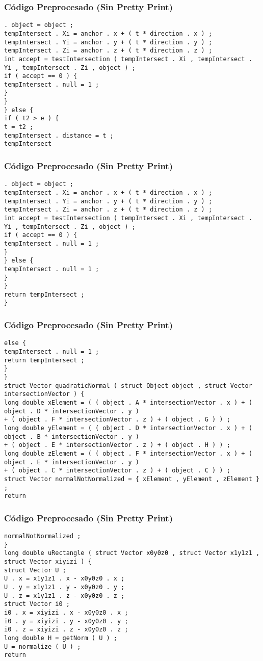 \documentclass{beamer}
\begin{document}
\begin{frame}[fragile]
\frametitle{C\'odigo Preprocesado (Sin Pretty Print)}
\begin{lstlisting}[style=CStyle]
. object = object ; 
tempIntersect . Xi = anchor . x + ( t * direction . x ) ; 
tempIntersect . Yi = anchor . y + ( t * direction . y ) ; 
tempIntersect . Zi = anchor . z + ( t * direction . z ) ; 
int accept = testIntersection ( tempIntersect . Xi , tempIntersect . Yi , tempIntersect . Zi , object ) ; 
if ( accept == 0 ) { 
tempIntersect . null = 1 ; 
} 
} 
} else { 
if ( t2 > e ) { 
t = t2 ; 
tempIntersect . distance = t ; 
tempIntersect \end{lstlisting}
\end{frame}
\begin{frame}[fragile]
\frametitle{C\'odigo Preprocesado (Sin Pretty Print)}
\begin{lstlisting}[style=CStyle]
. object = object ; 
tempIntersect . Xi = anchor . x + ( t * direction . x ) ; 
tempIntersect . Yi = anchor . y + ( t * direction . y ) ; 
tempIntersect . Zi = anchor . z + ( t * direction . z ) ; 
int accept = testIntersection ( tempIntersect . Xi , tempIntersect . Yi , tempIntersect . Zi , object ) ; 
if ( accept == 0 ) { 
tempIntersect . null = 1 ; 
} 
} else { 
tempIntersect . null = 1 ; 
} 
} 
return tempIntersect ; 
} \end{lstlisting}
\end{frame}
\begin{frame}[fragile]
\frametitle{C\'odigo Preprocesado (Sin Pretty Print)}
\begin{lstlisting}[style=CStyle]
else { 
tempIntersect . null = 1 ; 
return tempIntersect ; 
} 
} 
struct Vector quadraticNormal ( struct Object object , struct Vector intersectionVector ) { 
long double xElement = ( ( object . A * intersectionVector . x ) + ( object . D * intersectionVector . y ) 
+ ( object . F * intersectionVector . z ) + ( object . G ) ) ; 
long double yElement = ( ( object . D * intersectionVector . x ) + ( object . B * intersectionVector . y ) 
+ ( object . E * intersectionVector . z ) + ( object . H ) ) ; 
long double zElement = ( ( object . F * intersectionVector . x ) + ( object . E * intersectionVector . y ) 
+ ( object . C * intersectionVector . z ) + ( object . C ) ) ; 
struct Vector normalNotNormalized = { xElement , yElement , zElement } ; 
return \end{lstlisting}
\end{frame}
\begin{frame}[fragile]
\frametitle{C\'odigo Preprocesado (Sin Pretty Print)}
\begin{lstlisting}[style=CStyle]
normalNotNormalized ; 
} 
long double uRectangle ( struct Vector x0y0z0 , struct Vector x1y1z1 , struct Vector xiyizi ) { 
struct Vector U ; 
U . x = x1y1z1 . x - x0y0z0 . x ; 
U . y = x1y1z1 . y - x0y0z0 . y ; 
U . z = x1y1z1 . z - x0y0z0 . z ; 
struct Vector i0 ; 
i0 . x = xiyizi . x - x0y0z0 . x ; 
i0 . y = xiyizi . y - x0y0z0 . y ; 
i0 . z = xiyizi . z - x0y0z0 . z ; 
long double H = getNorm ( U ) ; 
U = normalize ( U ) ; 
return \end{lstlisting}
\end{frame}
\end{document}
